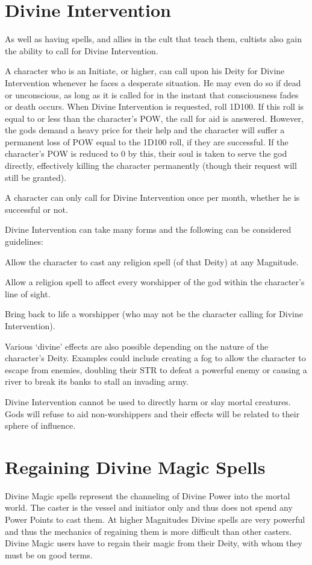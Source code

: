 \section{Divine Intervention}
As well as having spells, and allies in the cult that teach them, cultists also gain the ability to call for Divine Intervention. 

A character who is an Initiate, or higher, can call upon his Deity for Divine Intervention whenever he faces a desperate situation. He may even do so if dead or unconscious, as long as it is called for in the instant that consciousness fades or death occurs. When Divine Intervention is requested, roll 1D100. If this roll is equal to or less than the character’s POW, the call for aid is answered. However, the gods demand a heavy price for their help and the character will suffer a permanent loss of POW equal to the 1D100 roll, if they are successful. If the character’s POW is reduced to 0 by this, their soul is taken to serve the god directly, effectively killing the character permanently (though their request will still be granted). 

A character can only call for Divine Intervention once per month, whether he is successful or not. 

Divine Intervention can take many forms and the following can be considered guidelines: 
\begin{rpg-list}
\item Allow the character to cast any religion spell (of that Deity) at any Magnitude.
\item Allow a religion spell to affect every worshipper of the god within the character’s line of sight. 
\item Bring back to life a worshipper (who may not be the character calling for Divine Intervention). 
\end{rpg-list}

Various ‘divine’ effects are also possible depending on the nature of the character’s Deity. Examples could include creating a fog to allow the character to escape from enemies, doubling their STR to defeat a powerful enemy or causing a river to break its banks to stall an invading army. 

Divine Intervention cannot be used to directly harm or slay mortal creatures. Gods will refuse to aid non-worshippers and their effects will be related to their sphere of influence. 


\section{Regaining Divine Magic Spells}
Divine Magic spells represent the channeling of Divine Power into the mortal world. The caster is the vessel and initiator only and thus does not spend any Power Points to cast them. At higher Magnitudes Divine spells are very powerful and thus the mechanics of regaining them is more difficult than other casters. Divine Magic users have to regain their magic from their Deity, with whom they must be on good terms. 

